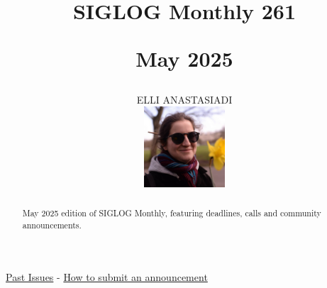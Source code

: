 \documentclass[prodmode,acmtecs]{acmsmall} %
\newcounter{colstart}
\begin{document}
\setcounter{colstart}{\thepage}

\title{{\huge\sc SIGLOG Monthly 261}

 May 2025}\author{ELLI ANASTASIADI\vspace*{-2.6cm}\begin{flushright}\includegraphics[width=30mm]{elli_anastasiadi.png}\end{flushright}}\begin{abstract}May 2025 edition of SIGLOG Monthly, featuring deadlines, calls and community announcements.
\end{abstract}


\maketitlee

\href{https://lics.siglog.org/newsletters/}{Past Issues}
 - 
\href{https://lics.siglog.org/newsletters/inst.html}{How to submit an announcement}
\end{document}
